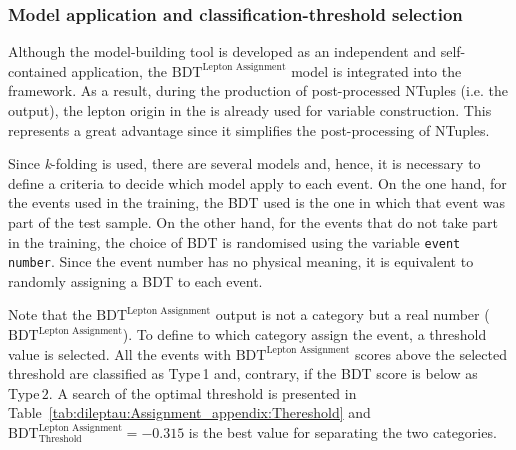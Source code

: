 
\subsubsection{Model application and classification-threshold selection}
\label{sec:ChaptH:Sig:LepAsign:SS:BDT:Application}


Although the model-building tool is developed as an independent 
and self-contained application, the $\text{BDT}^{\text{Lepton Assignment}}$
model is integrated into the \thqloop framework. As a result, during the production 
of post-processed NTuples (i.e. the \thqloop output), the lepton origin in the 
\dilepSStau is already used for variable construction. 
This represents a great advantage since it simplifies the post-processing of NTuples.

Since \textit{k}-folding is used, there are several models and, hence, it is necessary to define a 
criteria to decide which model apply to each event. On the one hand, for the events used in the training, the BDT
used is the one in which that event was part of the test sample. On the other hand, for the events
that do not take part in the training, the choice of BDT is randomised using the variable \texttt{event number}.
Since the event number has no physical meaning, it is equivalent to randomly assigning a BDT to each event. 


Note that the $\text{BDT}^{\text{Lepton Assignment}}$
output is not a category but a real number ($\text{BDT}^{\text{Lepton Assignment}}$). To define
to which category assign the event, a threshold value is selected. All the events
with $\text{BDT}^{\text{Lepton Assignment}}$ scores above the selected threshold are classified as  Type$\,$1
and, contrary, if the BDT score is below as Type$\,2$. 
A search of the optimal threshold is presented in Table~\ref{tab:dileptau:Assignment_appendix:Thereshold}
and $\text{BDT}_{\text{Threshold}}^{\text{Lepton Assignment}} = -0.315$ is the best value for 
separating the two categories.


